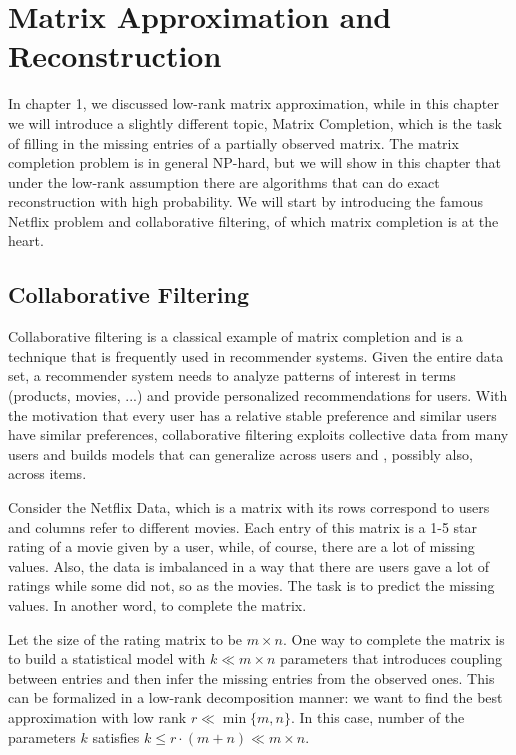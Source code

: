 \documentclass[../main.tex]{subfiles}
\begin{document}

\chapter{Matrix Approximation and Reconstruction}
In chapter 1, we discussed low-rank matrix approximation, while in this chapter we will introduce a slightly different topic, Matrix Completion, which is the task of filling in the missing entries of a partially observed matrix. The matrix completion problem is in general NP-hard, but we will show in this chapter that under the low-rank assumption there are algorithms that can do exact reconstruction with high probability. We will start by introducing the famous Netflix problem and collaborative filtering, of which matrix completion is at the heart.
\section{Collaborative Filtering}
Collaborative filtering is a classical example of matrix completion and is a technique that is frequently used in recommender systems. Given the entire data set, a recommender system needs to analyze patterns of interest in terms (products, movies, ...) and provide personalized recommendations for users. With the motivation that every user has a relative stable preference and similar users have similar preferences, collaborative filtering exploits collective data from many users and builds models that can generalize across users and , possibly also, across items.
\par Consider the Netflix Data, which is a matrix with its rows correspond to users and columns refer to different movies. Each entry of this matrix is a 1-5 star rating of a movie given by a user, while, of course, there are a lot of missing values. Also, the data is imbalanced in a way that there are users gave a lot of ratings while some did not, so as the movies. The task is to predict the missing values. In another word, to complete the matrix.
\par Let the size of the rating matrix to be  $m\times n$. One way to complete the matrix is to build a statistical model with $k\ll m\times n$ parameters that introduces coupling between entries and then infer the missing entries from the observed ones. This can be formalized in a low-rank decomposition manner: we want to find the best approximation with low rank $r\ll \min\{m,n\}$. In this case, number of the parameters $k$ satisfies $k\leq r\cdot (m+n)\ll m\times n$.
\end{document}
